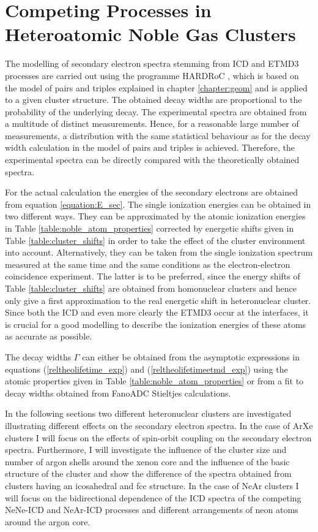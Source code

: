 \chapter[Heteroatomic Noble Gas Clusters]{Competing Processes in Heteroatomic Noble Gas Clusters}
\label{chapter_clusters}

The modelling of secondary electron spectra stemming from \ac{ICD}
and \ac{ETMD}3 processes are carried out using the programme
HARDRoC \cite{HARDRoC}, which is based on the model of pairs and
triples explained in chapter \ref{chapter:geom} and is applied
to a given cluster structure. The obtained
decay widths are proportional to the probability of the underlying decay.
The experimental spectra are obtained from a multitude of distinct measurements.
Hence, for a reasonable large number of measurements, a distribution with the
same statistical behaviour as for the decay width calculation in the
model of pairs and triples is achieved. Therefore, the experimental spectra
can be directly compared with the theoretically obtained spectra.

For the actual calculation the energies of the secondary electrons are obtained
from equation \ref{equation:E_sec}. The single ionization energies
can be obtained in two different ways. They can be
approximated by the atomic ionization energies in Table
\ref{table:noble_atom_properties} corrected by energetic shifts
given in Table \ref{table:cluster_shifts} in order to take
the effect of the cluster environment into account. 
Alternatively, they can be taken from the single ionization spectrum
measured at the same time and the same conditions as the electron-electron
coincidence experiment. The latter is to be preferred, since the energy shifts
of Table \ref{table:cluster_shifts} are obtained from homonuclear clusters and
hence only give a first approximation to the real energetic shift in
heteronuclear cluster. Since both the \ac{ICD} and even more clearly the
\ac{ETMD}3 occur at the interfaces, it is crucial for a good modelling to
describe the ionization energies of these atoms as accurate as possible.

The decay widths $\Gamma$ can either be obtained from the asymptotic expressions
in equations (\ref{reltheolifetime_exp}) and (\ref{reltheolifetimeetmd_exp})
using the atomic properties given in Table \ref{table:noble_atom_properties}
or from a fit to decay widths obtained from FanoADC Stieltjes calculations.

In the following sections two different heteronuclear clusters are investigated
illustrating different effects on the secondary electron spectra.
In the case of ArXe clusters I will focus on the effects of spin-orbit coupling
on the secondary electron spectra. Furthermore, I will investigate the influence
of the cluster size and number of argon shells around the xenon core and
the influence of the basic structure of the cluster and show the
difference of the spectra
obtained from clusters having an icosahedral
and \ac{fcc} structure.
In the case of NeAr clusters I will focus on the bidirectional dependence of
the ICD spectra of the competing NeNe-ICD and NeAr-ICD processes and
different arrangements of neon atoms around the argon core.

\newpage

\newpage


